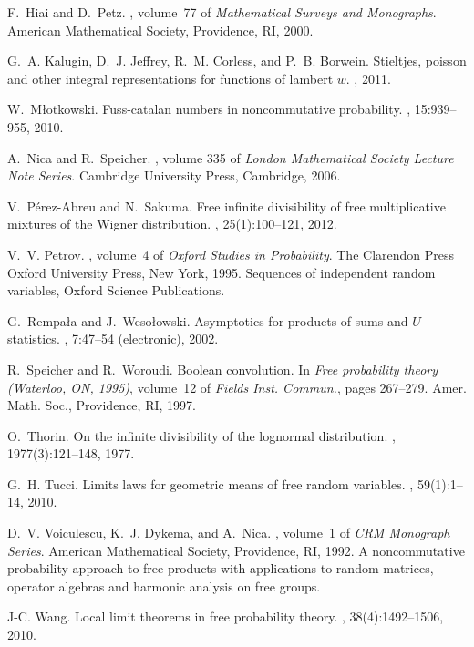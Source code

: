 \documentclass[12pt]{amsart}
\theoremstyle{definition}
\numberwithin{equation}{section}
\begin{document}
\begin{thebibliography}{HD}
F.~Hiai and D.~Petz.
,
  volume~77 of {\em Mathematical Surveys and Monographs}.
\newblock American Mathematical Society, Providence, RI, 2000.

G.~A. Kalugin, D.~J. Jeffrey, R.~M. Corless, and P.~B. Borwein.
\newblock Stieltjes, poisson and other integral representations for functions
  of lambert $w$.
, 2011.

W.~M{\l}otkowski.
\newblock Fuss-catalan numbers in noncommutative probability.
, 15:939--955, 2010.

A.~Nica and R.~Speicher.
, volume 335
  of {\em London Mathematical Society Lecture Note Series}.
\newblock Cambridge University Press, Cambridge, 2006.

V.~P{\'e}rez-Abreu and N.~Sakuma.
\newblock Free infinite divisibility of free multiplicative mixtures of the
  {W}igner distribution.
, 25(1):100--121, 2012.

V.~V. Petrov.
, volume~4 of {\em Oxford
  Studies in Probability}.
\newblock The Clarendon Press Oxford University Press, New York, 1995.
\newblock Sequences of independent random variables, Oxford Science
  Publications.

G.~Rempa{\l}a and J.~Weso{\l}owski.
\newblock Asymptotics for products of sums and {$U$}-statistics.
, 7:47--54 (electronic), 2002.

R.~Speicher and R.~Woroudi.
\newblock Boolean convolution.
\newblock In {\em Free probability theory ({W}aterloo, {ON}, 1995)}, volume~12
  of {\em Fields Inst. Commun.}, pages 267--279. Amer. Math. Soc., Providence,
  RI, 1997.

O.~Thorin.
\newblock On the infinite divisibility of the lognormal distribution.
, 1977(3):121--148, 1977.

G.~H. Tucci.
\newblock Limits laws for geometric means of free random variables.
, 59(1):1--14, 2010.

D.~V. Voiculescu, K.~J. Dykema, and A.~Nica.
, volume~1 of {\em CRM Monograph Series}.
\newblock American Mathematical Society, Providence, RI, 1992.
\newblock A noncommutative probability approach to free products with
  applications to random matrices, operator algebras and harmonic analysis on
  free groups.

J-C. Wang.
\newblock Local limit theorems in free probability theory.
, 38(4):1492--1506, 2010.

\end{thebibliography}
\end{document}
